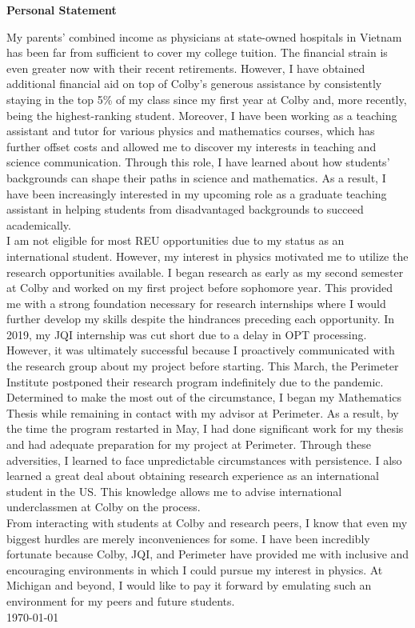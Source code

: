 \documentclass[12pt]{article}
\begin{document}
\begin{center}
	\textbf{Personal Statement}
\end{center}
My parents' combined income as physicians at state-owned hospitals in Vietnam has been far from sufficient to cover my college tuition. The financial strain is even greater now with their recent retirements. However,  I have obtained additional financial aid on top of Colby's generous assistance by consistently staying in the top 5\% of my class since my first year at Colby and, more recently, being the highest-ranking student. Moreover, I have been working as a teaching assistant and tutor for various physics and mathematics courses, which has further offset costs and allowed me to discover my interests in teaching and science communication. Through this role, I have learned about how students' backgrounds can shape their paths in science and mathematics. As a result, I have been increasingly interested in my upcoming role as a graduate teaching assistant in helping students from disadvantaged backgrounds to succeed academically. \\

I am not eligible for most REU opportunities due to my status as an international student. However, my interest in physics motivated me to utilize the research opportunities available. I began research as early as my second semester at Colby and worked on my first project before sophomore year. This provided me with a strong foundation necessary for research internships where I would further develop my skills despite the hindrances preceding each opportunity. In 2019, my JQI internship was cut short due to a delay in OPT processing. However, it was ultimately successful because I proactively communicated with the research group about my project before starting. This March, the Perimeter Institute postponed their research program indefinitely due to the pandemic. Determined to make the most out of the circumstance, I began my Mathematics Thesis while remaining in contact with my advisor at Perimeter. As a result, by the time the program restarted in May, I had done significant work for my thesis and had adequate preparation for my project at Perimeter. Through these adversities, I learned to face unpredictable circumstances with persistence. I also learned a great deal about obtaining research experience as an international student in the US. This knowledge allows me to advise international underclassmen at Colby on the process.\\

From interacting with students at Colby and research peers, I know that even my biggest hurdles are merely inconveniences for some. I have been incredibly fortunate because Colby, JQI, and Perimeter have provided me with inclusive and encouraging environments in which I could pursue my interest in physics. At Michigan and beyond, I would like to pay it forward by emulating such an environment for my peers and future students.\\

\noindent \today
\end{document}

